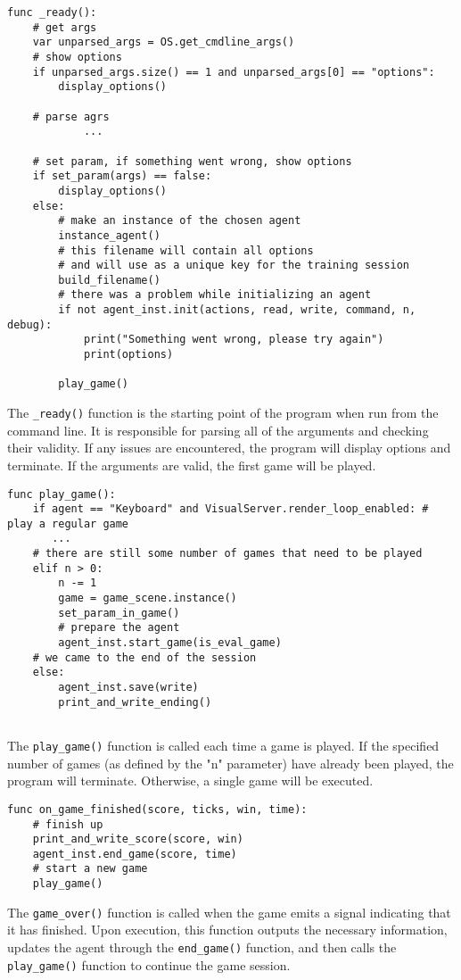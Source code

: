 \begin{lstlisting}
func _ready():
    # get args
    var unparsed_args = OS.get_cmdline_args()
    # show options
    if unparsed_args.size() == 1 and unparsed_args[0] == "options":
        display_options()
        
    # parse agrs
    		...
            
    # set param, if something went wrong, show options
    if set_param(args) == false:
        display_options()
    else:
        # make an instance of the chosen agent
        instance_agent()
        # this filename will contain all options 
        # and will use as a unique key for the training session
        build_filename()
        # there was a problem while initializing an agent
        if not agent_inst.init(actions, read, write, command, n, debug):
            print("Something went wrong, please try again")
            print(options)

        play_game()
\end{lstlisting}
The \texttt{\_ready()} function is the starting point of the program when run from the command line. It is responsible for parsing all of the arguments and checking their validity. If any issues are encountered, the program will display options and terminate. If the arguments are valid, the first game will be played. 

\begin{lstlisting} 
func play_game():     
    if agent == "Keyboard" and VisualServer.render_loop_enabled: # play a regular game
       ...
    # there are still some number of games that need to be played
    elif n > 0:
        n -= 1
        game = game_scene.instance()
        set_param_in_game()
        # prepare the agent
        agent_inst.start_game(is_eval_game)
    # we came to the end of the session
    else:
        agent_inst.save(write)
        print_and_write_ending()
               
\end{lstlisting}
The \texttt{play\_game()} function is called each time a game is played. If the specified number of games (as defined by the "n" parameter) have already been played, the program will terminate. Otherwise, a single game will be executed.

\begin{lstlisting}
func on_game_finished(score, ticks, win, time):
    # finish up
    print_and_write_score(score, win)
    agent_inst.end_game(score, time)        
    # start a new game
    play_game()
\end{lstlisting}
The \texttt{game\_over()} function is called when the game emits a signal indicating that it has finished. Upon execution, this function outputs the necessary information, updates the agent through the \texttt{end\_game()} function, and then calls the \texttt{play\_game()} function to continue the game session.